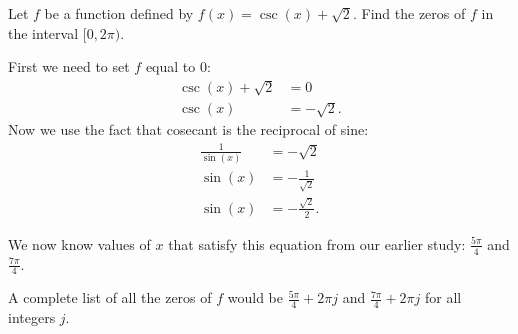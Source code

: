 \documentclass{ximera}
\begin{document}
\begin{example}
Let $f$ be a function defined by $f(x)=\csc(x) + \sqrt{2}$. Find the zeros of $f$ in the interval $[0, 2\pi)$.
\begin{explanation}
First we need to set $f$ equal to $0$:
\begin{align*}
\csc(x) + \sqrt{2} & = 0 \\
\csc(x) & = -\sqrt{2}.
\end{align*}
Now we use the fact that cosecant is the reciprocal of sine:
\begin{align*}
\frac{1}{\sin(x)} & = -\sqrt{2} \\
\sin(x) & = -\frac{1}{\sqrt{2}} \\
\sin(x) & = -\frac{\sqrt{2}}{2}.
\end{align*}

We now know values of $x$ that satisfy this equation from our earlier study: $\frac{5\pi}{4}$ and $\frac{7\pi}{4}$. 

A complete list of all the zeros of $f$ would be $\frac{5\pi}{4} + 2\pi j$ and $\frac{7\pi}{4} + 2\pi j$ for all integers $j$. 
\end{explanation}
\end{example}
\end{document}
